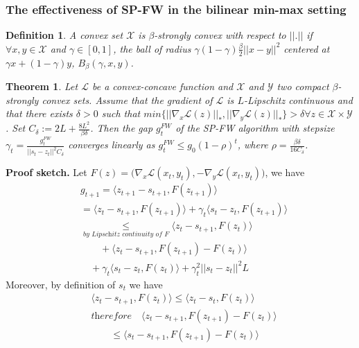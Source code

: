 \documentclass{article}
\newtheorem{theorem}{Theorem}
\newtheorem{definition}{Definition}
\begin{document}
\subsubsection{The effectiveness of SP-FW in the bilinear min-max setting}
\begin{definition}
A convex set $\mathcal{X}$ is $\beta$-strongly convex with respect to $||.||$ if $\forall x,y\in\mathcal{X}$ and $\gamma\in[0,1]$, the ball of radius $\gamma(1-\gamma)\frac{\beta}{2}||x- y||^2$ centered at $\gamma x+ (1-\gamma)y$, $B_{\beta}(\gamma,x,y)$.
\end{definition}
\begin{theorem} \cite{Gideletal16}
Let $\mathcal{L}$ be a convex-concave function and $\mathcal{X}$ and $\mathcal{Y}$ two compact $\beta$-strongly convex sets. Assume that the gradient of $\mathcal{L}$ is $L$-Lipschitz continuous and that there exists $\delta > 0$ such that $\textit{min}\{||\nabla_{x}\mathcal{L}(z)||_{*},||\nabla_{y}\mathcal{L}(z)||_{*}\} > \delta \forall z\in\mathcal{X}\times\mathcal{Y}$. Set $C_{\delta}:= 2L+ \frac{8L^{2}}{\beta\delta}$. Then the gap $g_{t}^{FW}$ of the SP-FW algorithm with stepsize $\gamma_{t}=\frac{g_{t}^{FW}}{||s_{t}-z_{t}||^{2}C_{\delta}}$ converges linearly as $g_{t}^{FW}\leq g_{0}(1-\rho)^{t}$, where $\rho= \frac{\beta\delta}{16C_{\delta}}$.
\end{theorem}
\textbf{Proof sketch.} Let $F(z)= \Big(\nabla_{x} \mathcal{L}(x_{t},y_{t}), -\nabla_{y} \mathcal{L}(x_{t},y_{t})\Big)$, we have
\begin{equation*}
\begin{aligned}
    &g_{t+1}=\langle z_{t+1}- s_{t+1}, F(z_{t+1}) \rangle\\
    &= \langle z_{t}- s_{t+1}, F(z_{t+1})\rangle+ \gamma_{t}\langle s_{t}- z_{t}, F(z_{t+1})\rangle\\
    &\underset{\textit{by Lipschitz continuity of $F$}}{\leq} \langle z_{t}- s_{t+1}, F(z_{t})\rangle\\
    &\quad\quad+ \langle z_{t}- s_{t+1}, F(z_{t+1})- F(z_{t})\rangle\\
    &\quad+ \gamma_{t}\langle s_{t}- z_{t}, F(z_{t})\rangle+ \gamma_{t}^{2}||s_{t}-z_{t}||^{2}L
\end{aligned}
\end{equation*}
Moreover, by definition of $s_{t}$ we have \begin{equation*}
\begin{aligned}
    &\langle z_{t}- s_{t+1}, F(z_{t})\rangle \leq \langle z_{t}- s_{t}, F(z_{t})\rangle\\
    &\textit{therefore}\quad \langle z_{t}- s_{t+1}, F(z_{t+1})- F(z_{t})\rangle\\
    &\quad\quad\leq \langle s_{t}- s_{t+1}, F(z_{t+1})- F(z_{t})\rangle
\end{aligned}
\end{equation*}
\end{document}
